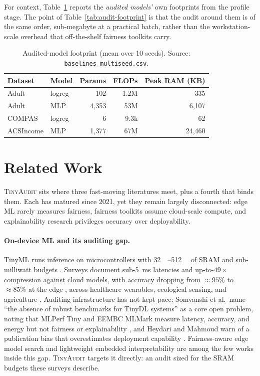 \documentclass[11pt]{article}
\begin{document}
For context, Table~\ref{tab:footprint} reports the \emph{audited models'} own
footprints from the profile stage. The point of Table~\ref{tab:audit-footprint}
is that the audit around them is of the same order, sub-megabyte at a practical
batch, rather than the workstation-scale overhead that off-the-shelf fairness
toolkits carry.

\begin{table}[t]
\centering
\caption{Audited-model footprint (mean over 10 seeds).
Source: \texttt{baselines\_multiseed.csv}.}
\label{tab:footprint}
\begin{tabular}{llrrr}
\toprule
Dataset & Model & Params & FLOPs & Peak RAM (KB) \\
\midrule
Adult      & logreg & 102   & 1.2M  & 335 \\
Adult      & MLP    & 4{,}353 & 53M & 6{,}107 \\
COMPAS     & logreg & 6     & 9.3k  & 62 \\
ACSIncome  & MLP    & 1{,}377 & 67M & 24{,}460 \\
\bottomrule
\end{tabular}
\end{table}

\section{Related Work}
\label{sec:related}

\textsc{TinyAudit} sits where three fast-moving literatures meet, plus a fourth
that binds them. Each has matured since 2021, yet they remain largely
disconnected: edge ML rarely measures fairness, fairness toolkits assume
cloud-scale compute, and explainability research privileges accuracy over
deployability.

\paragraph{On-device ML and its auditing gap.} TinyML runs inference on
microcontrollers with \SIrange{32}{512}{\kilo\byte} of SRAM and sub-milliwatt
budgets \cite{somvanshi2025tinydl}. Surveys document sub-\SI{5}{\milli\second}
latencies and up-to-$49\times$ compression against cloud models, with accuracy
dropping from $\approx\!95\%$ to $\approx\!85\%$ at the edge
\cite{heydari2025tinyml}, across healthcare wearables, ecological sensing, and
agriculture \cite{hayajneh2024agriculture,mohammad2025iot}. Auditing
infrastructure has not kept pace: Somvanshi et al.\ name ``the absence of robust
benchmarks for TinyDL systems'' as a core open problem, noting that MLPerf Tiny
and EEMBC MLMark measure latency, accuracy, and energy but not fairness or
explainability \cite{somvanshi2025tinydl}, and Heydari and Mahmoud warn of a
publication bias that overestimates deployment capability
\cite{heydari2025tinyml}. Fairness-aware edge model search
\cite{sheng2022fahana} and lightweight embedded interpretability
\cite{alnusif2025xai} are among the few works inside this gap.
\textsc{TinyAudit} targets it directly: an audit sized for the SRAM budgets these
surveys describe.
\end{document}

